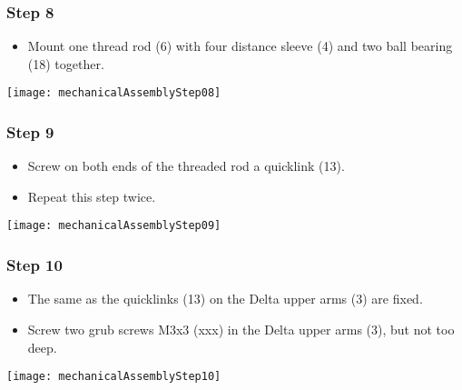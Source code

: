 \subsubsection{Step 8}

\begin{minipage}[t]{0.6\textwidth}
	\begin{itemize}
		\item Mount one thread rod (6) with four distance sleeve (4) and two ball bearing (18) together.
	\end{itemize}
\end{minipage}
\hfill
\begin{minipage}[t]{0.35\textwidth}
	\vspace{-\ht\strutbox}\texttt{[image: mechanicalAssemblyStep08]}
	\label{fig:MechanicalAssebmlyStep08} 
\end{minipage}

\subsubsection{Step 9}

\begin{minipage}[t]{0.6\textwidth}
	\begin{itemize}
		\item Screw on both ends of the threaded rod a quicklink (13).
		\item Repeat this step twice.
	\end{itemize}
\end{minipage}
\hfill
\begin{minipage}[t]{0.35\textwidth}
	\vspace{-\ht\strutbox}\texttt{[image: mechanicalAssemblyStep09]}
	\label{fig:MechanicalAssebmlyStep09} 
\end{minipage}

\subsubsection{Step 10}

\begin{minipage}[t]{0.6\textwidth}
	\begin{itemize}
		\item The same as the quicklinks (13) on the Delta upper arms (3) are fixed.
		\item Screw two grub screws M3x3 (xxx) in the Delta upper arms (3), but not too deep.
	\end{itemize}
\end{minipage}
\hfill
\begin{minipage}[t]{0.35\textwidth}
	\vspace{-\ht\strutbox}\texttt{[image: mechanicalAssemblyStep10]}
	\label{fig:MechanicalAssebmlyStep10} 
\end{minipage}

